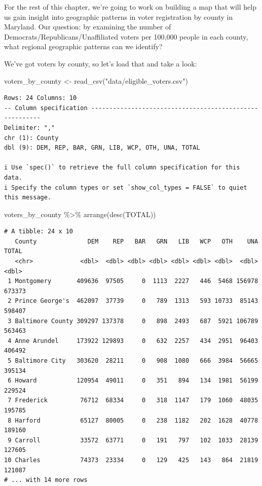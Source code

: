 \documentclass[
  letterpaper,
  DIV=11,
  numbers=noendperiod]{scrreprt}
\newenvironment{Shaded}{\begin{snugshade}}{\end{snugshade}}
\newcommand{\FunctionTok}[1]{\textcolor[rgb]{0.28,0.35,0.67}{#1}}
\newcommand{\NormalTok}[1]{\textcolor[rgb]{0.00,0.23,0.31}{#1}}
\newcommand{\OtherTok}[1]{\textcolor[rgb]{0.00,0.23,0.31}{#1}}
\newcommand{\SpecialCharTok}[1]{\textcolor[rgb]{0.37,0.37,0.37}{#1}}
\newcommand{\StringTok}[1]{\textcolor[rgb]{0.13,0.47,0.30}{#1}}
\begin{document}
For the rest of this chapter, we're going to work on building a map that
will help us gain insight into geographic patterns in voter registration
by county in Maryland. Our question: by examining the number of
Democrats/Republicans/Unaffiliated voters per 100,000 people in each
county, what regional geographic patterns can we identify?

We've got voters by county, so let's load that and take a look:

\begin{Shaded}
\begin{Highlighting}[]
\NormalTok{voters\_by\_county }\OtherTok{\textless{}{-}} \FunctionTok{read\_csv}\NormalTok{(}\StringTok{"data/eligible\_voters.csv"}\NormalTok{)}
\end{Highlighting}
\end{Shaded}

\begin{verbatim}
Rows: 24 Columns: 10
-- Column specification --------------------------------------------------------
Delimiter: ","
chr (1): County
dbl (9): DEM, REP, BAR, GRN, LIB, WCP, OTH, UNA, TOTAL

i Use `spec()` to retrieve the full column specification for this data.
i Specify the column types or set `show_col_types = FALSE` to quiet this message.
\end{verbatim}

\begin{Shaded}
\begin{Highlighting}[]
\NormalTok{voters\_by\_county }\SpecialCharTok{\%\textgreater{}\%} \FunctionTok{arrange}\NormalTok{(}\FunctionTok{desc}\NormalTok{(TOTAL))}
\end{Highlighting}
\end{Shaded}

\begin{verbatim}
# A tibble: 24 x 10
   County              DEM    REP   BAR   GRN   LIB   WCP   OTH    UNA  TOTAL
   <chr>             <dbl>  <dbl> <dbl> <dbl> <dbl> <dbl> <dbl>  <dbl>  <dbl>
 1 Montgomery       409636  97505     0  1113  2227   446  5468 156978 673373
 2 Prince George's  462097  37739     0   789  1313   593 10733  85143 598407
 3 Baltimore County 309297 137378     0   898  2493   687  5921 106789 563463
 4 Anne Arundel     173922 129893     0   632  2257   434  2951  96403 406492
 5 Baltimore City   303620  28211     0   908  1080   666  3984  56665 395134
 6 Howard           120954  49011     0   351   894   134  1981  56199 229524
 7 Frederick         76712  68334     0   318  1147   179  1060  48035 195785
 8 Harford           65127  80005     0   238  1182   202  1628  40778 189160
 9 Carroll           33572  63771     0   191   797   102  1033  28139 127605
10 Charles           74373  23334     0   129   425   143   864  21819 121087
# ... with 14 more rows
\end{verbatim}
\end{document}
